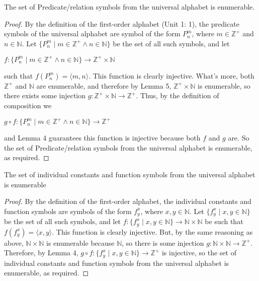 \documentclass{article}
\begin{document}
\begin{lemma} The set of Predicate/relation symbols from the universal alphabet is enumerable. \end{lemma}
\begin{proof}
By the definition of the first-order alphabet (Unit 1: 1), the predicate symbols of the universal alphabet are symbol of the form $P_n^m$, where $m \in \mathbb{Z^+}$ and $n \in \mathbb{N}$. Let $\{ P_n^m \mid m \in \mathbb{Z^+} \wedge n \in \mathbb{N} \}$ be the set of all such symbols, and let \begin{center} $f: \{ P_n^m \mid m \in \mathbb{Z^+} \wedge n \in \mathbb{N} \} \rightarrow \mathbb{Z^+} \times \mathbb{N}$\end{center} such that $f(P_n^m) = \langle m, n \rangle$. This function is clearly injective. What's more, both $\mathbb{Z^+}$ and $\mathbb{N}$ are enumerable, and therefore by Lemma 5,  $\mathbb{Z^+} \times \mathbb{N}$ is enumerable, so there exists some injection $g: \mathbb{Z^+} \times \mathbb{N} \rightarrow \mathbb{Z^+}$. Thus,  by the definition of composition we \begin{center} $g \circ f: \{ P_n^m \mid m \in \mathbb{Z^+} \wedge n \in \mathbb{N} \} \rightarrow \mathbb{Z^+}$ \end{center} and Lemma 4 guarantees this function is injective because both $f$ and $g$ are. So the set of Predicate/relation symbols from the universal alphabet is enumerable, as required. 
\end{proof}
\begin{lemma} The set of individual constants and function symbols from the universal alphabet is enumerable \end{lemma}
\begin{proof}
By the definition of the first-order alphabet, the individual constants and function symbols are symbols of the form $f_y^x$, where $x,y \in \mathbb{N}$. Let $\{f_y^x \mid x,y \in \mathbb{N}\}$ be the set of all such symbols, and let $f: \{f_y^x \mid x,y \in \mathbb{N}\} \rightarrow \mathbb{N} \times \mathbb{N}$ be such that $f(f_y^x) = \langle x, y \rangle$. This function is clearly injective. But, by the same reasoning as above, $\mathbb{N} \times \mathbb{N}$ is enumerable because $\mathbb{N}$, so there is some injection $g:  \mathbb{N} \times \mathbb{N} \rightarrow \mathbb{Z^+}$. Therefore, by Lemma 4, $g \circ f:  \{f_y^x \mid x,y \in \mathbb{N}\} \rightarrow \mathbb{Z^+}$ is injective, so the set of individual constants and function symbols from the universal alphabet is enumerable, as required. 
\end{proof}
\end{document}
